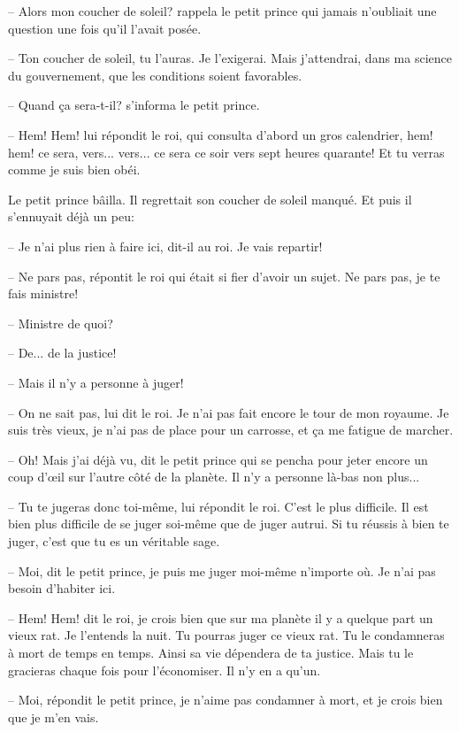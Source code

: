 \documentclass[a4paper]{report}
\begin{document}
-- Alors mon coucher de soleil? rappela le petit prince qui jamais n'oubliait une question une fois qu'il l'avait posée.

-- Ton coucher de soleil, tu l'auras. Je l'exigerai. Mais j'attendrai, dans ma science du gouvernement, que les conditions soient favorables.

-- Quand ça sera-t-il? s'informa le petit prince.

-- Hem! Hem! lui répondit le roi, qui consulta d'abord un gros calendrier, hem! hem! ce sera, vers... vers... ce sera ce soir vers sept heures quarante! Et tu verras comme je suis bien obéi.

Le petit prince bâilla. Il regrettait son coucher de soleil manqué. Et puis il s'ennuyait déjà un peu:

-- Je n'ai plus rien à faire ici, dit-il au roi. Je vais repartir!

-- Ne pars pas, répontit le roi qui était si fier d'avoir un sujet. Ne pars pas, je te fais ministre!

-- Ministre de quoi?

-- De... de la justice!

-- Mais il n'y a personne à juger!

-- On ne sait pas, lui dit le roi. Je n'ai pas fait encore le tour de mon royaume. Je suis très vieux, je n'ai pas de place pour un carrosse, et ça me fatigue de marcher.

-- Oh! Mais j'ai déjà vu, dit le petit prince qui se pencha pour jeter encore un coup d'œil sur l'autre côté de la planète. Il n'y a personne là-bas non plus...

-- Tu te jugeras donc toi-même, lui répondit le roi. C'est le plus difficile. Il est bien plus difficile de se juger soi-même que de juger autrui. Si tu réussis à bien te juger, c'est que tu es un véritable sage.

-- Moi, dit le petit prince, je puis me juger moi-même n'importe où. Je n'ai pas besoin d'habiter ici.

-- Hem! Hem! dit le roi, je crois bien que sur ma planète il y a quelque part un vieux rat. Je l'entends la nuit. Tu pourras juger ce vieux rat. Tu le condamneras à mort de temps en temps. Ainsi sa vie dépendera de ta justice. Mais tu le gracieras chaque fois pour l'économiser. Il n'y en a qu'un.

-- Moi, répondit le petit prince, je n'aime pas condamner à mort, et je crois bien que je m'en vais.
\end{document}
